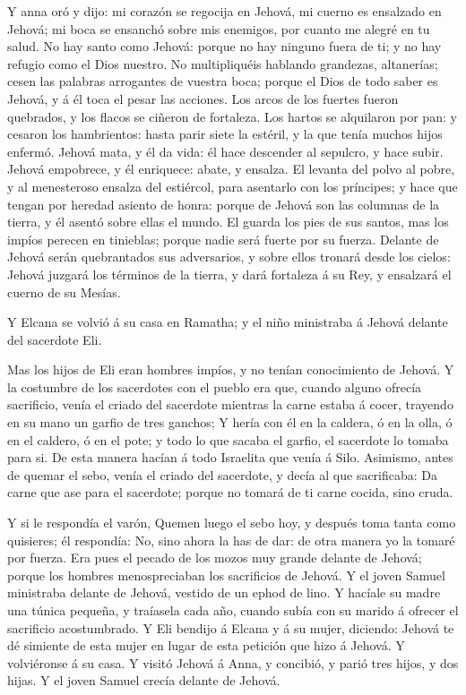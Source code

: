  Y anna oró y dijo: mi corazón se regocija en Jehová, mi
cuerno es ensalzado en Jehová; mi boca se ensanchó sobre mis enemigos,
por cuanto me alegré en tu salud.  No hay santo como Jehová:
porque no hay ninguno fuera de ti; y no hay refugio como el Dios
nuestro.  No multipliquéis hablando grandezas, altanerías;
cesen las palabras arrogantes de vuestra boca; porque el Dios de todo
saber es Jehová, y á él toca el pesar las acciones.  Los
arcos de los fuertes fueron quebrados, y los flacos se ciñeron de
fortaleza.  Los hartos se alquilaron por pan: y cesaron los
hambrientos: hasta parir siete la estéril, y la que tenía muchos hijos
enfermó.  Jehová mata, y él da vida: él hace descender al
sepulcro, y hace subir.  Jehová empobrece, y él enriquece:
abate, y ensalza.  El levanta del polvo al pobre, y al
menesteroso ensalza del estiércol, para asentarlo con los príncipes; y
hace que tengan por heredad asiento de honra: porque de Jehová son las
columnas de la tierra, y él asentó sobre ellas el mundo.  El
guarda los pies de sus santos, mas los impíos perecen en tinieblas;
porque nadie será fuerte por su fuerza.  Delante de Jehová
serán quebrantados sus adversarios, y sobre ellos tronará desde los
cielos: Jehová juzgará los términos de la tierra, y dará fortaleza á su
Rey, y ensalzará el cuerno de su Mesías.

 Y Elcana se volvió á su casa en Ramatha; y el niño
ministraba á Jehová delante del sacerdote Eli.

 Mas los hijos de Eli eran hombres impíos, y no tenían
conocimiento de Jehová.  Y la costumbre de los sacerdotes
con el pueblo era que, cuando alguno ofrecía sacrificio, venía el criado
del sacerdote mientras la carne estaba á cocer, trayendo en su mano un
garfio de tres ganchos;  Y hería con él en la caldera, ó en
la olla, ó en el caldero, ó en el pote; y todo lo que sacaba el garfio,
el sacerdote lo tomaba para si. De esta manera hacían á todo Israelita
que venía á Silo.  Asimismo, antes de quemar el sebo, venía
el criado del sacerdote, y decía al que sacrificaba: Da carne que ase
para el sacerdote; porque no tomará de ti carne cocida, sino cruda.

 Y si le respondía el varón, Quemen luego el sebo hoy, y
después toma tanta como quisieres; él respondía: No, sino ahora la has
de dar: de otra manera yo la tomaré por fuerza.  Era pues
el pecado de los mozos muy grande delante de Jehová; porque los hombres
menospreciaban los sacrificios de Jehová.  Y el joven
Samuel ministraba delante de Jehová, vestido de un ephod de lino.
 Y hacíale su madre una túnica pequeña, y traíasela cada
año, cuando subía con su marido á ofrecer el sacrificio acostumbrado.
 Y Eli bendijo á Elcana y á su mujer, diciendo: Jehová te
dé simiente de esta mujer en lugar de esta petición que hizo á Jehová. Y
volviéronse á su casa.  Y visitó Jehová á Anna, y concibió,
y parió tres hijos, y dos hijas. Y el joven Samuel crecía delante de
Jehová.


